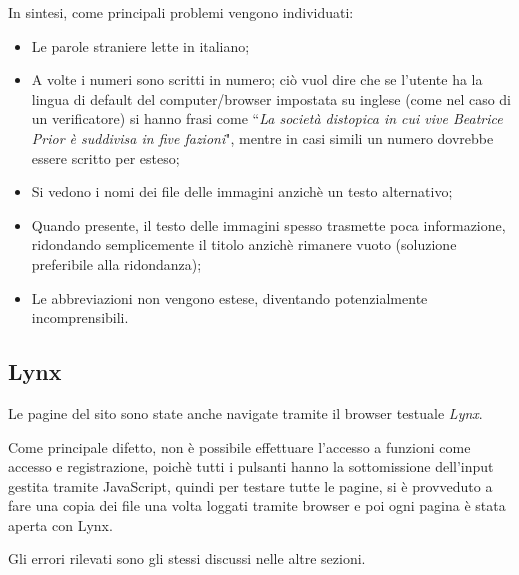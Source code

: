 In sintesi, come principali problemi vengono individuati:
\begin{itemize}
\item Le parole straniere lette in italiano;
\item A volte i numeri sono scritti in numero; ciò vuol dire che se l'utente
ha la lingua di default del computer/browser impostata su inglese (come nel
caso di un verificatore) si hanno frasi come ``\textit{La società distopica in
cui vive Beatrice Prior è suddivisa in five fazioni}", mentre in casi simili
un numero dovrebbe essere scritto per esteso;
\item Si vedono i nomi dei file delle immagini anzichè un testo alternativo;
\item Quando presente, il testo delle immagini spesso trasmette poca
informazione, ridondando semplicemente il titolo anzichè rimanere vuoto
(soluzione preferibile alla ridondanza);
\item Le abbreviazioni non vengono estese, diventando potenzialmente
incomprensibili.
\end{itemize}

\subsection{Lynx}\label{sec:lynx} %
Le pagine del sito sono state anche navigate tramite il browser testuale
\textit{Lynx}.

Come principale difetto, non è possibile effettuare l'accesso a funzioni come
accesso e registrazione, poichè tutti i pulsanti hanno la sottomissione
dell'input gestita tramite JavaScript, quindi per testare tutte le pagine, si è
provveduto a fare una copia dei file una volta loggati tramite browser e poi
ogni pagina è stata aperta con Lynx.

Gli errori rilevati sono gli stessi discussi nelle altre sezioni.
